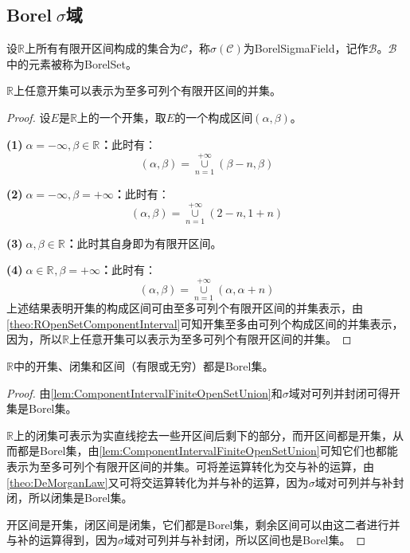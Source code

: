 \subsection{Borel$\;\sigma$域}
\begin{definition}
	设$\mathbb{R}$上所有有限开区间构成的集合为$\mathcal{C}$，称$\sigma(\mathcal{C})$为\gls{BorelSigmaField}，记作$\mathcal{B}$。$\mathcal{B}$中的元素被称为\gls{BorelSet}。
\end{definition}
\begin{lemma}\label{lem:ComponentIntervalFiniteOpenSetUnion}
	$\mathbb{R}$上任意开集可以表示为至多可列个有限开区间的并集。
\end{lemma}
\begin{proof}
	设$E$是$\mathbb{R}$上的一个开集，取$E$的一个构成区间$(\alpha,\beta)$。\par
	\textbf{(1)$\;\alpha=-\infty,\beta\in\mathbb{R}^{}$：}此时有：
	\begin{equation*}
		(\alpha,\beta)=\underset{n=1}{\overset{+\infty}{\cup}}(\beta-n,\beta)
	\end{equation*}\par
	\textbf{(2)$\;\alpha=-\infty,\beta=+\infty$：}此时有：
	\begin{equation*}
		(\alpha,\beta)=\underset{n=1}{\overset{+\infty}{\cup}}(2-n,1+n)
	\end{equation*}\par
	\textbf{(3)$\;\alpha,\beta\in\mathbb{R}^{}$：}此时其自身即为有限开区间。\par
	\textbf{(4)$\;\alpha\in\mathbb{R}^{},\beta=+\infty$：}此时有：
	\begin{equation*}
		(\alpha,\beta)=\underset{n=1}{\overset{+\infty}{\cup}}(\alpha,\alpha+n)
	\end{equation*}
	上述结果表明开集的构成区间可由至多可列个有限开区间的并集表示，由\cref{theo:ROpenSetComponentInterval}可知开集至多由可列个构成区间的并集表示，因为，所以$\mathbb{R}$上任意开集可以表示为至多可列个有限开区间的并集。
\end{proof}
\begin{theorem}
	$\mathbb{R}$中的开集、闭集和区间（有限或无穷）都是Borel集。
\end{theorem}
\begin{proof}
	由\cref{lem:ComponentIntervalFiniteOpenSetUnion}和$\sigma$域对可列并封闭可得开集是Borel集。\par
	$\mathbb{R}$上的闭集可表示为实直线挖去一些开区间后剩下的部分，而开区间都是开集，从而都是Borel集，由\cref{lem:ComponentIntervalFiniteOpenSetUnion}可知它们也都能表示为至多可列个有限开区间的并集。可将差运算转化为交与补的运算，由\cref{theo:DeMorganLaw}又可将交运算转化为并与补的运算，因为$\sigma$域对可列并与补封闭，所以闭集是Borel集。\par
	开区间是开集，闭区间是闭集，它们都是Borel集，剩余区间可以由这二者进行并与补的运算得到，因为$\sigma$域对可列并与补封闭，所以区间也是Borel集。
\end{proof}
